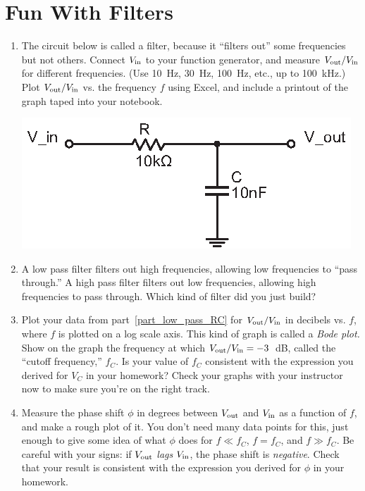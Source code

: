 \section{Fun With Filters}
\label{lab_filters}


\bigskip

\begin{enumerate}[wide]

\item The circuit below is called a filter, because it ``filters out'' some frequencies but not others.  Connect $V_{\rm in}$ to your function generator, and measure $V_{\rm out}/V_{\rm in}$ for different frequencies.  (Use 10~Hz, 30~Hz, 100~Hz, etc., up to 100~kHz.)  Plot $V_{\rm out}/V_{\rm in}$ vs. the frequency $f$ using Excel, and include a printout of the graph taped into your notebook.  \label{part_low_pass_RC}
\begin{center}
\includegraphics{filters/low_pass_filter_RC.eps}
\end{center}

\item A low pass filter filters out high frequencies, allowing low frequencies to ``pass through.''  A high pass filter filters out low frequencies, allowing high frequencies to pass through.  Which kind of filter did you just build?  

\item Plot your data from part~\ref{part_low_pass_RC} for $V_{\rm out}/V_{\rm in}$ in decibels vs. $f$, where $f$ is plotted on a log scale axis.  This kind of graph is called a \textit{Bode plot.}  Show on the graph the frequency at which $V_{\rm out}/V_{\rm in}=-3$~dB, called the ``cutoff frequency,'' $f_C$.  Is your value of $f_C$ consistent with the expression you derived for $V_C$ in your homework?  Check your graphs with your instructor now to make sure you're on the right track.\label{part_low_pass_log_plot}

\item Measure the phase shift $\phi$ in degrees between $V_{\rm out}$ and $V_{\rm in}$ as a function of $f$, and make a rough plot of it.  You don't need many data points for this, just enough to give some idea of what $\phi$ does for $f \ll f_C$, $f = f_C$, and $f \gg f_C$.  Be careful with your signs: if $V_{\rm out}$ \textit{lags} $V_{\rm in}$, the phase shift is \textit{negative}.  Check that your result is consistent with the expression you derived for $\phi$ in your homework.


\end{enumerate}
